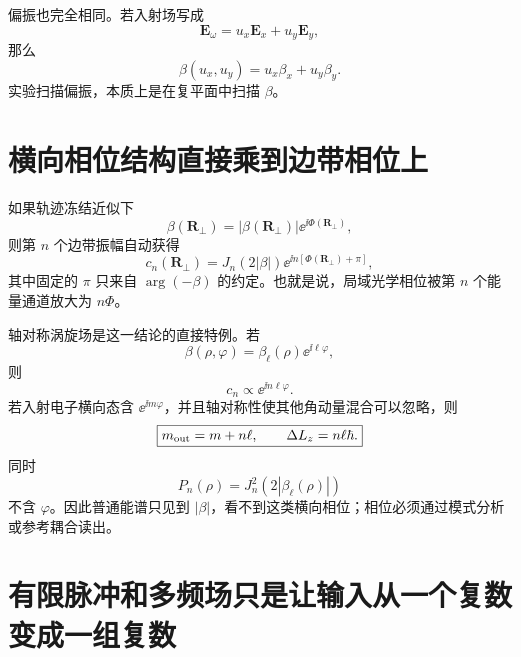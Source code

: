 偏振也完全相同。若入射场写成
\begin{equation}
\bm E_\omega=u_x\bm E_x+u_y\bm E_y,
\end{equation}
那么
\begin{equation}
\boxed{\beta(u_x,u_y)=u_x\beta_x+u_y\beta_y.}
\label{eq:polarization-beta}
\end{equation}
实验扫描偏振，本质上是在复平面中扫描 \(\beta\)。

\section{横向相位结构直接乘到边带相位上}

如果轨迹冻结近似下
\begin{equation}
\beta(\bm R_\perp)=|\beta(\bm R_\perp)|\ee^{\ii\Phi(\bm R_\perp)},
\end{equation}
则第 \(n\) 个边带振幅自动获得
\begin{equation}
\boxed{
c_n(\bm R_\perp)
=J_n\!\left(2|\beta|\right)
\ee^{\ii n[\Phi(\bm R_\perp)+\pi]},}
\label{eq:general-transverse-phase-multiplication}
\end{equation}
其中固定的 \(\pi\) 只来自 \(\arg(-\beta)\) 的约定。也就是说，局域光学相位被第 \(n\) 个能量通道放大为 \(n\Phi\)。

轴对称涡旋场是这一结论的直接特例。若
\begin{equation}
\beta(\rho,\varphi)=\beta_\ell(\rho)\ee^{\ii\ell\varphi},
\end{equation}
则
\begin{equation}
c_n\propto\ee^{\ii n\ell\varphi}.
\end{equation}
若入射电子横向态含 \(\ee^{\ii m\varphi}\)，并且轴对称性使其他角动量混合可以忽略，则
\begin{equation}
\boxed{m_{\rm out}=m+n\ell,
\qquad \Delta L_z=n\ell\hbar.}
\label{eq:oam-selection-rule}
\end{equation}
同时
\begin{equation}
P_n(\rho)=J_n^2\!\left(2|\beta_\ell(\rho)|\right)
\end{equation}
不含 \(\varphi\)。因此普通能谱只见到 \(|\beta|\)，看不到这类横向相位；相位必须通过模式分析或参考耦合读出。

\section{有限脉冲和多频场只是让输入从一个复数变成一组复数}

